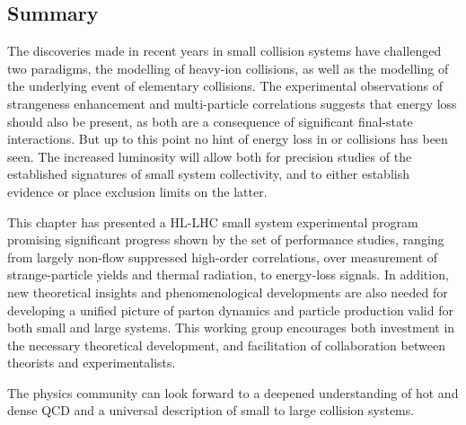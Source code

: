 \documentclass[../report.tex]{subfiles}
\begin{document}
\subsection{Summary}

The discoveries made in recent years in small collision systems have challenged two paradigms, the modelling of heavy-ion collisions, as well as the modelling of the underlying event of elementary \pp collisions. The experimental observations of strangeness enhancement and multi-particle correlations suggests that energy loss should also be present, as both are a consequence of significant final-state interactions. But up to this point no hint of energy loss in \pp or \pPb collisions has been seen. The increased luminosity will allow both for precision studies of the established signatures of small system collectivity, and to either establish evidence or place exclusion limits on the latter.

This chapter has presented a HL-LHC small system experimental program promising significant progress shown by the set of performance studies, ranging from largely non-flow suppressed high-order correlations, over measurement of strange-particle yields and thermal radiation, to energy-loss signals. In addition, new theoretical insights and phenomenological developments are also needed for developing a unified picture of parton dynamics and particle production valid for both small and large systems. This working group encourages both investment in the necessary theoretical development, and facilitation of collaboration between theorists and experimentalists. 

The physics community can look forward to a deepened understanding of hot and dense QCD and a universal description of small to large collision systems.
\end{document}
